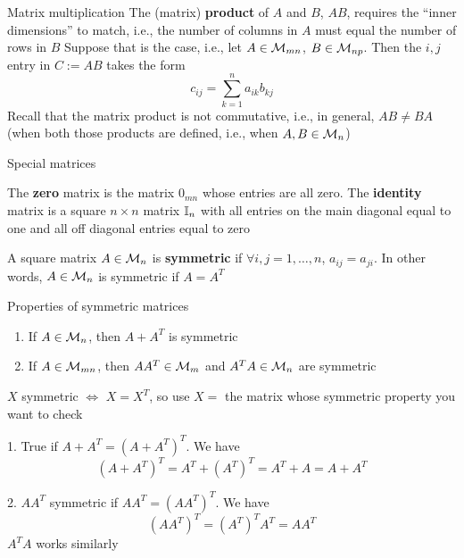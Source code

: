 \documentclass[aspectratio=169]{beamer}\usepackage[]{graphicx}\usepackage[]{xcolor}
\begin{document}
\begin{frame}{Matrix multiplication}
The (matrix) \textbf{product} of $A$ and $B$, $AB$, requires the ``inner dimensions'' to match, i.e., the number of columns in $A$ must equal the number of rows in $B$
\vfill
Suppose that is the case, i.e., let $A\in\mathcal{M}_{mn}$, $B\in\mathcal{M}_{np}$. Then the $i,j$ entry in $C:=AB$ takes the form
\[
c_{ij} = \sum_{k=1}^n a_{ik}b_{kj}
\]
\vfill
Recall that the matrix product is not commutative, i.e., in general, $AB\neq BA$ (when both those products are defined, i.e., when $A,B\in\mathcal{M}_n$)
\end{frame}

\begin{frame}{Special matrices}
\begin{definition}
The \textbf{zero} matrix is the matrix $0_{mn}$ whose entries are all zero.
The \textbf{identity} matrix is a square $n\times n$ matrix $\mathbb{I}_n$ with all entries on the main diagonal equal to one and all off diagonal entries equal to zero
\end{definition}
\begin{definition}
A square matrix $A\in\mathcal{M}_n$ is \textbf{symmetric} if $\forall i,j=1,\ldots,n$, $a_{ij}=a_{ji}$. In other words, $A\in\mathcal{M}_n$ is symmetric if $A=A^T$
\end{definition}
\end{frame}


\begin{frame}{Properties of symmetric matrices}
\begin{theorem}
\begin{enumerate}
	\item If $A\in\mathcal{M}_n$, then $A+A^T$ is symmetric
	\item If $A\in\mathcal{M}_{mn}$, then $AA^T\in\mathcal{M}_m$ and $A^TA\in\mathcal{M}_n$ are symmetric
\end{enumerate}
\end{theorem}
\vfill
$X$ symmetric $\iff$ $X=X^T$, so use $X=$ the matrix whose symmetric property you want to check

1. True if $A+A^T=(A+A^T)^T$. We have 
\[
(A+A^T)^T=A^T+(A^T)^T=A^T+A=A+A^T
\]

2. $AA^T$ symmetric if $AA^T=(AA^T)^T$. We have 
\[
(AA^T)^T=(A^T)^TA^T=AA^T
\]
$A^TA$ works similarly
\end{frame}
\end{document}
